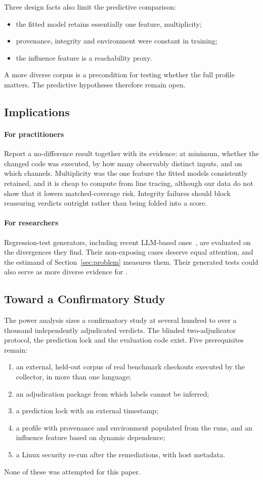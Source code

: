 Three design facts also limit the predictive comparison:
\begin{itemize}
\item the fitted model retains essentially one feature, multiplicity;
\item provenance, integrity and environment were constant in training;
\item the influence feature is a reachability proxy.
\end{itemize}
A more diverse corpus is a precondition for testing whether the full profile matters. The predictive hypotheses therefore remain open.

\subsection{Implications}
\paragraph*{For practitioners} Report a no-difference result together with its evidence: at minimum, whether the changed code was executed, by how many observably distinct inputs, and on which channels. Multiplicity was the one feature the fitted models consistently retained, and it is cheap to compute from line tracing, although our data do not show that it lowers matched-coverage risk. Integrity failures should block reassuring verdicts outright rather than being folded into a score.

\paragraph*{For researchers} Regression-test generators, including recent LLM-based ones~\cite{pradel2026testora,hu2026difftestgen,ayub2026semadiff}, are evaluated on the divergences they find. Their non-exposing cases deserve equal attention, and the estimand of Section~\ref{sec:problem} measures them. Their generated tests could also serve as more diverse evidence for \sbg{}.

\subsection{Toward a Confirmatory Study}
The power analysis sizes a confirmatory study at several hundred to over a thousand independently adjudicated \NDO{} verdicts. The blinded two-adjudicator protocol, the prediction lock and the evaluation code exist. Five prerequisites remain:
\begin{enumerate}
\item an external, held-out corpus of real benchmark checkouts executed by the collector, in more than one language;
\item an adjudication package from which labels cannot be inferred;
\item a prediction lock with an external timestamp;
\item a profile with provenance and environment populated from the runs, and an influence feature based on dynamic dependence;
\item a Linux security re-run after the remediations, with host metadata.
\end{enumerate}
None of these was attempted for this paper.
